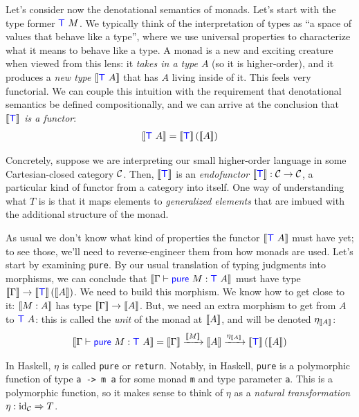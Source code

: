 Let's consider now the denotational semantics of monads.
Let's start with the type former $\mathsf{{\color{blue}T}}~M$.
We typically think of the interpretation of types as ``a space of values that
behave like a type'', where we use universal properties to characterize what it
means to behave like a type. A monad is a new and exciting creature when viewed from 
this lens: it \emph{takes in a type $A$} (so it is higher-order), and it 
produces a \emph{new type} $\left\llbracket \mathsf{{\color{blue}T}}~A \right\rrbracket$  that has $A$ living inside of it.
This feels very functorial. We can couple this intuition with the requirement 
that denotational semantics be defined compositionally, and we can arrive at the 
conclusion that \emph{$\left\llbracket \mathsf{{\color{blue}T}} \right\rrbracket$ is a functor}:
\begin{align}
    \left\llbracket \mathsf{{\color{blue}T}}~A \right\rrbracket = \left\llbracket \mathsf{{\color{blue}T}} \right\rrbracket(\left\llbracket A \right\rrbracket)
\end{align}

Concretely, suppose we are interpreting our small higher-order language in 
some Cartesian-closed category $\mathcal C$. Then, $\left\llbracket \mathsf{{\color{blue}T}} \right\rrbracket$ 
is an \emph{endofunctor} $\left\llbracket \mathsf{{\color{blue}T}} \right\rrbracket : \mathcal C \to \mathcal C$, a particular 
kind of functor from a category into itself. One way of understanding what 
$T$ is is that it maps elements to \emph{generalized elements} that are 
imbued with the additional structure of the monad.

As usual we don't know what kind of properties the functor
$\left\llbracket \mathsf{{\color{blue}T}}~A \right\rrbracket$ must have yet; to see those, we'll need to
reverse-engineer them from how monads are used. Let's start by 
examining \texttt{pure}. By our usual translation of typing judgments 
into morphisms, we can conclude that 
$\left\llbracket \Gamma \vdash {\mathsf{{\color{blue}pure}}~M} : \mathsf{{\color{blue}T}}~A \right\rrbracket$ 
must have type $\left\llbracket \Gamma \right\rrbracket \to \left\llbracket \mathsf{{\color{blue}T}} \right\rrbracket(\left\llbracket A \right\rrbracket)$.
We need to build this morphism.
We know how to get close to it: 
$\left\llbracket M : A \right\rrbracket$ has type $\left\llbracket \Gamma \right\rrbracket \to \left\llbracket A \right\rrbracket$.
But, we need an extra morphism to get from $A$ to $\mathsf{{\color{blue}T}}~A$: 
this is called the \emph{unit} of the monad at $\left\llbracket A \right\rrbracket$, and will be denoted 
$\eta_{\left\llbracket A \right\rrbracket}$:
\begin{align*}
    \left\llbracket \Gamma \vdash \mathsf{{\color{blue}pure}}~M :\mathsf{{\color{blue}T}}~A \right\rrbracket = 
    \left\llbracket \Gamma \right\rrbracket \xrightarrow{\left\llbracket M \right\rrbracket} \left\llbracket A \right\rrbracket \xrightarrow{\eta_{\left\llbracket A \right\rrbracket}} \left\llbracket \mathsf{{\color{blue}T}} \right\rrbracket(\left\llbracket A \right\rrbracket)
\end{align*}

In Haskell, $\eta$ is called \texttt{pure} or \texttt{return}. 
Notably, in Haskell, \texttt{pure} is a polymorphic function of 
type \texttt{a -> m a} for some monad \texttt{m} and type 
parameter \texttt{a}. This is a polymorphic function, 
so it makes sense to think of $\eta$ as a \emph{natural transformation}
$\eta : \operatorname{id}_\mathcal C \Rightarrow T$.

